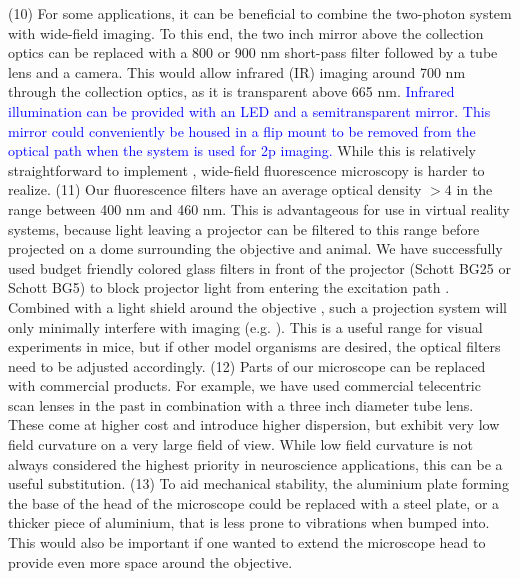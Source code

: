 \documentclass[10pt,letterpaper]{article}
\begin{document}
(10) For some applications, it can be beneficial to combine the two-photon system with wide-field imaging. To this end, the two inch mirror above the collection optics can be replaced with a 800 or 900 nm short-pass filter followed by a tube lens and a camera. This would allow infrared (IR) imaging around 700 nm through the collection optics, as it is transparent above 665 nm. \textcolor{blue}{Infrared illumination can be provided with an LED and a semitransparent mirror. This mirror could conveniently be housed in a flip mount to be removed from the optical path when the system is used for 2p imaging.} While this is relatively straightforward to implement \cite{Rosenegger2014}, wide-field fluorescence microscopy is harder to realize.\newline
(11) Our fluorescence filters have an average optical density $>4$ in the range between 400 nm and 460 nm. This is advantageous for use in virtual reality systems, because light leaving a projector can be filtered to this range before projected on a dome surrounding the objective and animal. We have successfully used budget friendly colored glass filters in front of the projector (Schott BG25 or Schott BG5) to block projector light from entering the excitation path \cite{Dombeck2007}. Combined with a light shield around the objective \cite{Dombeck2010}, such a projection system will only minimally interfere with imaging (e.g. \cite{Nieh2021}). This is a useful range for visual experiments in mice, but if other model organisms are desired, the optical filters need to be adjusted accordingly.\newline
(12) Parts of our microscope can be replaced with commercial products. For example, we have used commercial telecentric scan lenses in the past \cite{Song2017, Rich2024} in combination with a three inch diameter tube lens. These come at higher cost and introduce higher dispersion, but exhibit very low field curvature on a very large field of view. While low field curvature is not always considered the highest priority in neuroscience applications, this can be a useful substitution.\newline
(13) To aid mechanical stability, the aluminium plate forming the base of the head of the microscope could be replaced with a steel plate, or a thicker piece of aluminium, that is less prone to vibrations when bumped into. This would also be important if one wanted to extend the microscope head to provide even more space around the objective.
\end{document}
